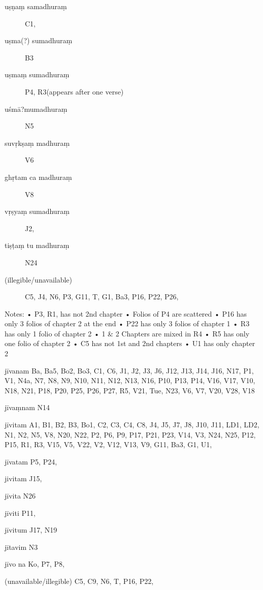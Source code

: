 \begin{ekdosis}
\begin{marma}[hp01_055]
\begin{marma}[hp01_063]
\begin{description}
\item[uṣṇaṃ samadhuraṃ]    C1,
\item[uṣma(?) sumadhuraṃ]    B3
\item[uṣmaṃ sumadhuraṃ]    P4, R3(appears after one verse)
\item[uśmā?mumadhuraṃ]  N5
\item[suvṛkṣaṃ madhuraṃ]    V6
\item[ghṛtam ca madhuraṃ]    V8
\item[vṛṣyaṃ sumadhuraṃ]    J2,
\item[tiṣṭaṃ tu madhuraṃ]  N24
\item[(illegible/unavailable)]   C5, J4, N6, P3, G11, T, G1, Ba3, P16, P22, P26,
    \end{description}
 \end{marma}

Notes:
    • P3, R1, has not 2nd chapter
    • Folios of P4 are scattered 
    • P16 has only 3 folios of chapter 2 at the end
    • P22 has only 3 folios of chapter 1
    • R3 has only 1 folio of chapter 2
    • 1 & 2 Chapters are mixed in R4
    • R5 has only one folio of chapter 2
    • C5 has not 1st and 2nd chapters
    • U1 has only chapter 2
\begin{marma}[hp02_003]
\item[jīvanam] Ba, Ba5, Bo2, Bo3, C1, C6, J1, J2, J3, J6, J12, J13, J14, J16, N17, P1, V1, N4a, N7, N8, N9, N10, N11, N12, N13, N16, P10, P13, P14, V16, V17, V10, N18, N21, P18, P20, P25, P26, P27, R5, V21, Tue, N23, V6, V7, V20, V28, V18
\item[jīvaṃnam] N14
\item[jīvitam] A1, B1, B2, B3, Bo1, C2, C3, C4, C8, J4, J5, J7, J8, J10, J11, LD1, LD2, N1, N2, N5, V8, N20, N22, P2, P6, P9, P17, P21, P23, V14, V3, N24, N25, P12, P15, R1, R3, V15, V5, V22, V2, V12, V13, V9, G11, Ba3, G1, U1, 
\item[jīvatam] P5, P24,
\item[jivitam] J15,
\item[jīvita] N26
\item[jīviti] P11, 
\item[jīvitum] J17, N19
\item[jītavim] N3
\item[jīvo na] Ko, P7, P8, 
\item[(unavailable/illegible)] C5, C9, N6, T, P16, P22,

  \begin{description}

    \end{description}
 \end{marma}


\end{marma}
\end{ekdosis}
